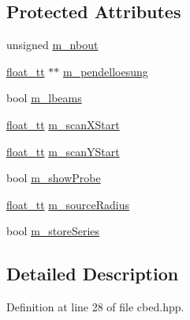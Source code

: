 \subsection*{Protected Attributes}
\begin{DoxyCompactItemize}
\item 
unsigned \hyperlink{class_q_s_t_e_m_1_1_c_experiment_c_b_e_d_adb9270d99daef86c658309cc0cf94247}{m\-\_\-nbout}
\item 
\hyperlink{namespace_q_s_t_e_m_a915d7caa497280d9f927c4ce8d330e47}{float\-\_\-tt} $\ast$$\ast$ \hyperlink{class_q_s_t_e_m_1_1_c_experiment_c_b_e_d_a67f32bbf65d442c2547befa3d2e59009}{m\-\_\-pendelloesung}
\item 
bool \hyperlink{class_q_s_t_e_m_1_1_c_experiment_c_b_e_d_a2773670ae5aa925743a1c68bcb407f5d}{m\-\_\-lbeams}
\item 
\hyperlink{namespace_q_s_t_e_m_a915d7caa497280d9f927c4ce8d330e47}{float\-\_\-tt} \hyperlink{class_q_s_t_e_m_1_1_c_experiment_c_b_e_d_a4cd4a135c98774170cf09ef27b93c3e4}{m\-\_\-scan\-X\-Start}
\item 
\hyperlink{namespace_q_s_t_e_m_a915d7caa497280d9f927c4ce8d330e47}{float\-\_\-tt} \hyperlink{class_q_s_t_e_m_1_1_c_experiment_c_b_e_d_a53348ab774fdda6e429d8b3ea47cc7b2}{m\-\_\-scan\-Y\-Start}
\item 
bool \hyperlink{class_q_s_t_e_m_1_1_c_experiment_c_b_e_d_ac910d30d06b30c84486549aeb0d31bba}{m\-\_\-show\-Probe}
\item 
\hyperlink{namespace_q_s_t_e_m_a915d7caa497280d9f927c4ce8d330e47}{float\-\_\-tt} \hyperlink{class_q_s_t_e_m_1_1_c_experiment_c_b_e_d_a54be0afefeca5082d0bf452c0908dfb8}{m\-\_\-source\-Radius}
\item 
bool \hyperlink{class_q_s_t_e_m_1_1_c_experiment_c_b_e_d_a70acb38c6e2fc479efd4586c9c711a71}{m\-\_\-store\-Series}
\end{DoxyCompactItemize}


\subsection{Detailed Description}


Definition at line 28 of file cbed.\-hpp.



